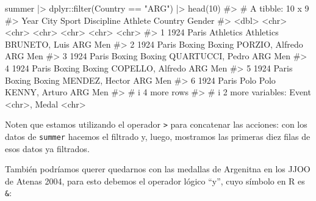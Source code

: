\documentclass[
  letterpaper,
  DIV=11,
  numbers=noendperiod,
  oneside]{scrreprt}
\newenvironment{Shaded}{\begin{snugshade}}{\end{snugshade}}
\newcommand{\CommentTok}[1]{\textcolor[rgb]{0.37,0.37,0.37}{#1}}
\newcommand{\DecValTok}[1]{\textcolor[rgb]{0.68,0.00,0.00}{#1}}
\newcommand{\FunctionTok}[1]{\textcolor[rgb]{0.28,0.35,0.67}{#1}}
\newcommand{\NormalTok}[1]{\textcolor[rgb]{0.00,0.23,0.31}{#1}}
\newcommand{\SpecialCharTok}[1]{\textcolor[rgb]{0.37,0.37,0.37}{#1}}
\newcommand{\StringTok}[1]{\textcolor[rgb]{0.13,0.47,0.30}{#1}}
\begin{document}
\begin{Shaded}
\begin{Highlighting}[]
\NormalTok{summer }\SpecialCharTok{|\textgreater{}}\NormalTok{ dplyr}\SpecialCharTok{::}\FunctionTok{filter}\NormalTok{(Country }\SpecialCharTok{==} \StringTok{"ARG"}\NormalTok{) }\SpecialCharTok{|\textgreater{}} \FunctionTok{head}\NormalTok{(}\DecValTok{10}\NormalTok{)}
\CommentTok{\#\textgreater{} \# A tibble: 10 x 9}
\CommentTok{\#\textgreater{}    Year City  Sport     Discipline Athlete          Country Gender}
\CommentTok{\#\textgreater{}   \textless{}dbl\textgreater{} \textless{}chr\textgreater{} \textless{}chr\textgreater{}     \textless{}chr\textgreater{}      \textless{}chr\textgreater{}            \textless{}chr\textgreater{}   \textless{}chr\textgreater{} }
\CommentTok{\#\textgreater{} 1  1924 Paris Athletics Athletics  BRUNETO, Luis    ARG     Men   }
\CommentTok{\#\textgreater{} 2  1924 Paris Boxing    Boxing     PORZIO, Alfredo  ARG     Men   }
\CommentTok{\#\textgreater{} 3  1924 Paris Boxing    Boxing     QUARTUCCI, Pedro ARG     Men   }
\CommentTok{\#\textgreater{} 4  1924 Paris Boxing    Boxing     COPELLO, Alfredo ARG     Men   }
\CommentTok{\#\textgreater{} 5  1924 Paris Boxing    Boxing     MENDEZ, Hector   ARG     Men   }
\CommentTok{\#\textgreater{} 6  1924 Paris Polo      Polo       KENNY, Arturo    ARG     Men   }
\CommentTok{\#\textgreater{} \# i 4 more rows}
\CommentTok{\#\textgreater{} \# i 2 more variables: Event \textless{}chr\textgreater{}, Medal \textless{}chr\textgreater{}}
\end{Highlighting}
\end{Shaded}

Noten que estamos utilizando el operador
\texttt{\textbar{}\textgreater{}} para concatenar las acciones: con los
datos de \texttt{summer} hacemos el filtrado y, luego, mostramos las
primeras diez filas de esos datos ya filtrados.

También podríamos querer quedarnos con las medallas de Argenitna en los
JJOO de Atenas 2004, para esto debemos el operador lógico ``y'', cuyo
símbolo en R es \texttt{\&}:
\end{document}

